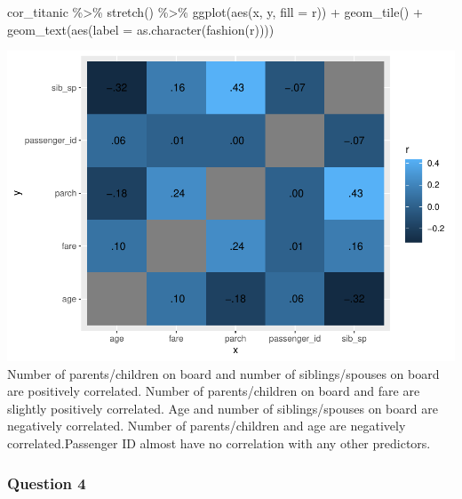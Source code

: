 \documentclass[
]{article}
\newenvironment{Shaded}{\begin{snugshade}}{\end{snugshade}}
\newcommand{\AttributeTok}[1]{\textcolor[rgb]{0.77,0.63,0.00}{#1}}
\newcommand{\FunctionTok}[1]{\textcolor[rgb]{0.00,0.00,0.00}{#1}}
\newcommand{\NormalTok}[1]{#1}
\newcommand{\SpecialCharTok}[1]{\textcolor[rgb]{0.00,0.00,0.00}{#1}}
\begin{document}
\begin{Shaded}
\begin{Highlighting}[]
\NormalTok{cor\_titanic }\SpecialCharTok{\%\textgreater{}\%}
  \FunctionTok{stretch}\NormalTok{() }\SpecialCharTok{\%\textgreater{}\%}
  \FunctionTok{ggplot}\NormalTok{(}\FunctionTok{aes}\NormalTok{(x, y, }\AttributeTok{fill =}\NormalTok{ r)) }\SpecialCharTok{+}
  \FunctionTok{geom\_tile}\NormalTok{() }\SpecialCharTok{+}
  \FunctionTok{geom\_text}\NormalTok{(}\FunctionTok{aes}\NormalTok{(}\AttributeTok{label =} \FunctionTok{as.character}\NormalTok{(}\FunctionTok{fashion}\NormalTok{(r))))}
\end{Highlighting}
\end{Shaded}

\includegraphics{hw3_files/figure-latex/unnamed-chunk-7-1.pdf} Number of
parents/children on board and number of siblings/spouses on board are
positively correlated. Number of parents/children on board and fare are
slightly positively correlated. Age and number of siblings/spouses on
board are negatively correlated. Number of parents/children and age are
negatively correlated.Passenger ID almost have no correlation with any
other predictors.

\hypertarget{question-4}{%
\subsubsection{Question 4}\label{question-4}}
\end{document}
